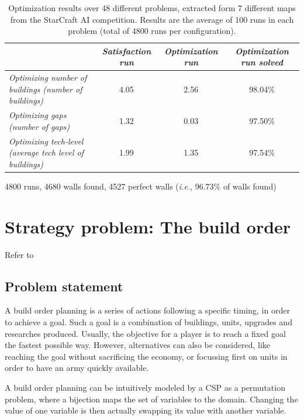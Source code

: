 \documentclass[journal]{IEEEtran}
\newcommand{\csp}{\textsc{CSP}\xspace}
\newcommand{\ie}{\textit{i.e.}}
\begin{document}
\begin{table}[tba]
    \centering
    \caption{Optimization results over 48 different problems, extracted form 7 different maps from the StarCraft AI competition. Results are the average of 100 runs in each problem (total of 4800 runs per configuration).}
    \begin{tabular}{|l|c|c|c|} \hline
    \label{tbl:wall}
									& {\em Satisfaction run}& {\em Optimization run}& {\em Optimization run solved} \\
                                                                        \hline
    	{\em Optimizing number of buildings (number of buildings)} 	& 4.05                  & 2.56                  & 98.04\% \\ 
    	{\em Optimizing gaps (number of gaps)} 				& 1.32                  & 0.03                  & 97.50\%  \\ 
    	{\em Optimizing tech-level (average tech level of buildings)} 	& 1.99                  & 1.35                 & 97.54\%  \\
        \hline
    \end{tabular}  
\end{table}

4800 runs, 4680 walls found, 4527 perfect walls (\ie, 96.73\% of walls found) 


\section{Strategy problem: The build order}\label{sec:bo}
Refer to \cite{ChurchillB11, KuchemPR13, WeberM09, ChoKC13, Blackford14} 
\subsection{Problem statement}
A build  order planning is  a series  of actions following  a specific
timing, in order  to achieve a goal.  Such a goal is  a combination of
buildings,  units,  upgrades  and researches  produced.  Usually,  the
objective for a  player is to reach a fixed  goal the fastest possible
way. However, alternatives  can also be considered,  like reaching the
goal without sacrificing  the economy, or focussing first  on units in
order to have an army quickly available.

A  build order  planning can  be intuitively  modeled by  a \csp  as a
permutation problem,  where a bijection  maps the set of  variables to
the  domain. Changing  the  value  of one  variable  is then  actually
swapping its value with another variable.
\end{document}
